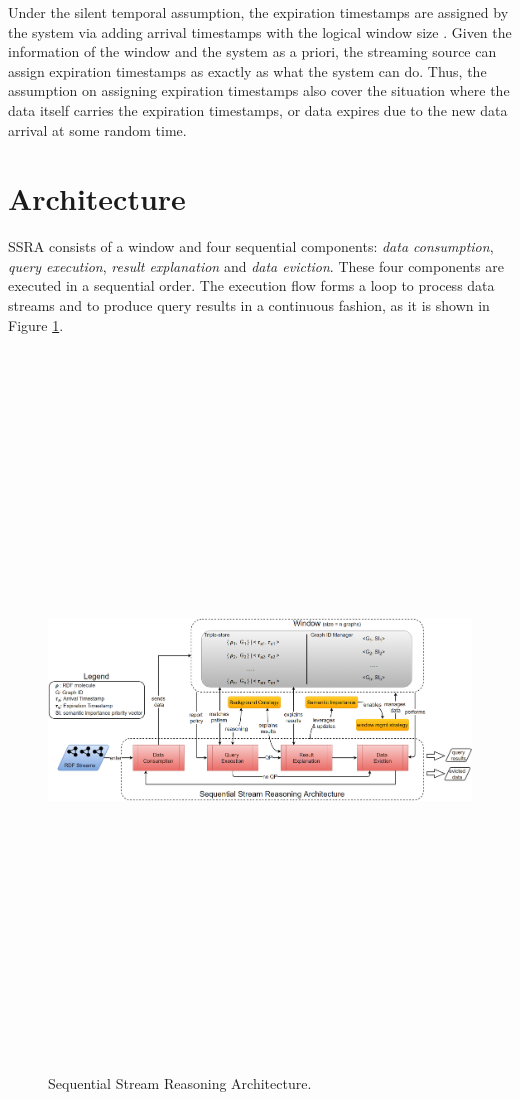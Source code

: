 Under the silent temporal assumption, the expiration timestamps are assigned by the system via adding arrival timestamps with the logical window size \cite{barbieri2010incremental}. 
Given the information of the window and the system as a priori, the streaming source can assign expiration timestamps as exactly as what the system can do. 
Thus, the assumption on assigning expiration timestamps also cover the situation where the data itself carries the expiration timestamps, or data expires due to the new data arrival at some random time. 
%
\section{Architecture}
SSRA consists of a window and four sequential components: \textit{data consumption}, \textit{query execution}, \textit{result explanation} and \textit{data eviction}.
These four components are executed in a sequential order. 
The execution flow forms a loop to process data streams and to produce query results in a continuous fashion, as it is shown in Figure \ref{fig:4-ssra}. 

\begin{figure}[!htbp]
	\centering
	\includegraphics[angle=90,height=7.5in]{img/4-ssra.png}
	\caption{Sequential Stream Reasoning Architecture.}
	\label{fig:4-ssra}
\end{figure}

